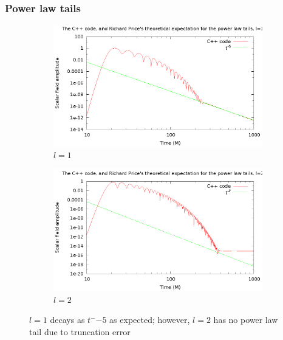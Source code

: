 \documentclass{beamer}
\begin{document}
\begin{frame}
  \frametitle{Power law tails}
  \begin{figure}
    \centering
    \begin{subfigure}{.45\textwidth}
      \centering
      \includegraphics[width=\textwidth]{l1m1tail2}
      \caption{$l=1$}
  \end{subfigure}
    \begin{subfigure}{.45\textwidth}
      \centering
      \includegraphics[width=\textwidth]{l2m2tailfail2}
      \caption{$l=2$}
    \end{subfigure}
  \caption{$l=1$ decays as $t^-{-5}$ as expected; however, $l=2$ has no power law tail due to truncation error}
  \end{figure}
\end{frame}
\end{document}
